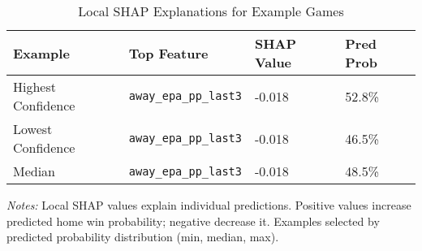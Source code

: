 \begin{table}[htbp]
\centering
\caption{Local SHAP Explanations for Example Games}
\label{tab:shap-local-examples}
\begin{threeparttable}
\begin{tabularx}{\linewidth}{@{}lYYY@{}}
\toprule
Example & Top Feature & SHAP Value & Pred Prob \\
\midrule
Highest Confidence & \texttt{away{\_}epa{\_}pp{\_}last3} & -0.018 & 52.8\% \\
Lowest Confidence & \texttt{away{\_}epa{\_}pp{\_}last3} & -0.018 & 46.5\% \\
Median & \texttt{away{\_}epa{\_}pp{\_}last3} & -0.018 & 48.5\% \\
\bottomrule
\end{tabularx}
\begin{tablenotes}[flushleft]
\footnotesize
\item \textit{Notes:} Local SHAP values explain individual predictions. Positive values increase predicted home win probability; negative decrease it. Examples selected by predicted probability distribution (min, median, max).
\end{tablenotes}
\end{threeparttable}
\end{table}
